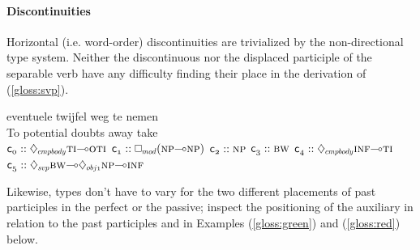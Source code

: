 \paragraph{Discontinuities}
Horizontal (i.e. word-order) discontinuities are trivialized by the non-directional type system.
Neither the discontinuous  nor the displaced participle of the separable verb  have any difficulty finding their place in the derivation of (\ref{gloss:svp}).
\begin{exe}
\label{gloss:svp}
 eventuele twijfel weg {\textlangle{}te} {nemen} \\
{To\textrangle} potential doubts away {} take \\
	$\con{0}::\ddia{cmpbody}\ti[s]\li\oti[s]$
	$\con{1}::\dbox{mod}(\np[s]\li\np[s])$
	$\con{2}::\np[s]$
	$\con{3}::\bw[s]$
	$\con{4}::\ddia{cmpbody}\infp[s]\li\ti[s]$
	$\con{5}::\ddia{svp}\bw[s]\li\ddia{obj1}\np[s]\li\infp[s]$\\
\end{exe}
Likewise, types don't have to vary for the two different placements of past participles in the perfect or the passive; inspect the positioning of the auxiliary  in relation to the past participles  and  in Examples (\ref{gloss:green}) and (\ref{gloss:red}) below.

